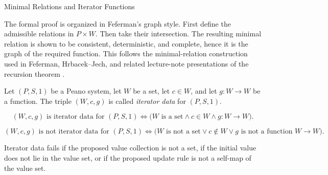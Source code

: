 \begin{topicbox}{Minimal Relations and Iterator Functions}
\begin{exposition}
The formal proof is organized in Feferman's graph style. First define the
admissible relations in $P\times W$. Then take their intersection. The
resulting minimal relation is shown to be consistent, deterministic, and
complete, hence it is the graph of the required function. This follows the
minimal-relation construction used in Feferman, Hrbacek--Jech, and related
lecture-note presentations of the recursion theorem
\citep{feferman1964numbersystems,hrbacek_jech1999,chi_recursion_wustl}.
\end{exposition}

\begin{tcolorbox}[colback=defbox, colframe=defborder, arc=2pt,
  left=6pt, right=6pt, top=4pt, bottom=4pt,
  title={\small\textbf{Definition (Iterator Data)}},
  fonttitle=\small\bfseries]
\begin{definition}
\label{def:iterator-data-on-peano-system}
Let $(P,S,1)$ be a Peano system, let $W$ be a set, let $c\in W$, and let
$g:W\to W$ be a function. The triple $(W,c,g)$ is called \emph{iterator data}
for $(P,S,1)$.
\end{definition}
\end{tcolorbox}

\begin{remark*}
\[
(W,c,g) \text{ is iterator data for } (P,S,1)
\Longleftrightarrow
\bigl(W \text{ is a set}\land c\in W\land g:W\to W\bigr).
\]
\end{remark*}


\begin{remark*}
\[
(W,c,g) \text{ is not iterator data for } (P,S,1)
\Longleftrightarrow
\bigl(W \text{ is not a set}\lor c\notin W\lor g \text{ is not a function } W\to W\bigr).
\]
\end{remark*}

\begin{remark*}
Iterator data fails if the proposed value collection is not a set, if the
initial value does not lie in the value set, or if the proposed update rule is
not a self-map of the value set.
\end{remark*}


\end{topicbox}
